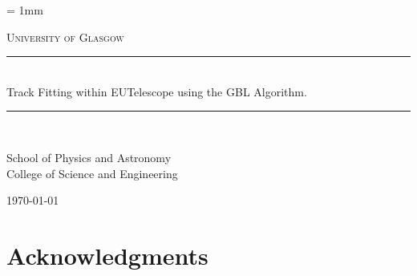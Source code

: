 \documentclass[12pt,a4paper]{report}
\newif\
\newcommand{\twolinesahead}[5][]{
  \def\dist{6};
  \newdimen\ym;
  \newdimen\xm;
  \newdimen\yf;
  \newdimen\xf;
  \ExtractCoordinate{$(#3)$}{\xm}{\ym};
  \ExtractCoordinate{$(#2)$}{\xf}{\yf};
  \ifdim \ym < \yf
  \def\fac{1};
  \else
  \def\fac{-1};
  \fi
  \path [pline] ([yshift=-\dist * \fac]#2.east) -- (#3.west);
  \coordinate (m) at ($(#2)!0.5!(#3)$);
  \coordinate (mp) at ($(m)+(0,1em*\fac)$);
  \node (nm) at (mp) {#5};
  \foreach \x in {\fac,0}
  {
    \ifnum \x = 0
    \path [pline, decoration={markings, mark=at position 0.5 with {\arrow{triangle 60}}}, postaction={decorate}] ([yshift=\dist * \x]#2.east) -- ([yshift=\dist * \x]#4.west);
    \else
    \path [pline] ([yshift=\dist * \x]#2.east) -- ([yshift=\dist * \x]#4.west);
    \fi
  };
}
\newcommand{\HRule}{\rule{\linewidth}{0.5mm}}
\begin{document}
\unitlength = 1mm

\onehalfspace

\begin{titlepage}
\begin{center}

\textsc{\LARGE University of Glasgow}\\[0.8cm]


\HRule\\[0.6cm]
{ \Huge Track Fitting within EUTelescope using the GBL Algorithm. }\\[0.6cm]
\HRule\\[0.7cm]

{
\Large


School of Physics and Astronomy\\
College of Science and Engineering\\[1.5cm]

}

\vfill

{\large \mydate\today}

\end{center}
\end{titlepage}



\chapter*{Acknowledgments}

\clearpage

\begin{abstract}

\end{abstract}
\clearpage


\tableofcontents
\clearpage


\pagestyle{fancy}

    \fancyhf{}%
    \fancyhead[LE,RO]{\thepage}
    \fancyhead[RE]{\textit{\nouppercase{\rightmark}} }
    \fancyhead[LO]{\textit{\nouppercase{\rightmark}} }
    \renewcommand{\headrulewidth}{0pt} %
    \renewcommand{\footrulewidth}{0pt}

\renewcommand{\chaptermark}[1]{ \markright{\thechapter \hspace{0.2cm} #1}{} }
\renewcommand{\sectionmark}[1]{ \markright{\thesection \hspace{0.2cm} #1}{} }
\end{document}

